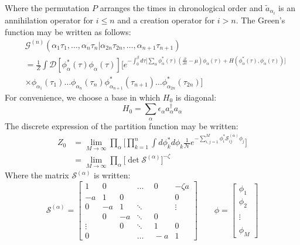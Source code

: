 \documentclass[12pt]{article}
\begin{document}
Where the permutation $P$ arranges the times in chronological order and 
$\tilde{a}_{\alpha_i}$ is an annihilation operator for $i\leq n$ and a creation 
operator for $i>n$. The Green's function may be written as follows:
\begin{equation*}
    \begin{split}
        &\mathcal{G}^{(n)}(\alpha_1\tau_1,\dots,\alpha_n\tau_n|
        \alpha_{2n}\tau_{2n},\dots,\alpha_{n+1}\tau_{n+1})\\
        &=\frac{1}{Z}\int\mathcal{D}[\phi^*_\alpha(\tau)\phi_\alpha(\tau)]
        \Big[e^{-\int_0^\beta d\tau
        \big[\sum_\alpha\phi_\alpha^*(\tau)(\frac{\partial}{\partial\tau}-\mu)
        \phi_\alpha(\tau)+H(\phi_\alpha^*(\tau),\phi_\alpha(\tau))\big]}\\
        &\times\phi_{\alpha_1}(\tau_1)\dots\phi_{\alpha_n}(\tau_n)
        \phi^*_{\alpha_{n+1}}(\tau_{n+1})\dots\phi^*_{\alpha_{2n}}(\tau_{2n})\Big]
    \end{split}
\end{equation*}
For convenience, we choose a base in which $H_0$ is diagonal:
\begin{equation*}
    H_0=\sum_\alpha\epsilon_\alpha a^\dagger_\alpha a_\alpha
\end{equation*}
The discrete expression of the partition function may be written:
\begin{equation*}
    \begin{split}
        Z_0&=\lim_{M\rightarrow\infty}\prod_\alpha\bigg[\prod_{k=1}^n\int 
        d\phi^*_kd\phi_k\frac{1}{\mathcal{N}}e^{
        -\sum\limits_{i,j=1}^M\phi^*_i\mathcal{S}^{(\alpha)}_{ij}\phi_j}\bigg]\\
        &=\lim_{M\rightarrow\infty}\prod_\alpha
        \big[\det\mathcal{S}^{(\alpha)}\big]^{-\zeta}
    \end{split}
\end{equation*}
Where the matrix $\mathcal{S}^{(\alpha)}$ is written:
\begin{equation*}
    \mathcal{S}^{(\alpha)}=\left[\begin{matrix}
        1      &0  &\   &\dots  &\ \ 0  &-\zeta a\\
        -a     &1  &0   &\      &\ \ \  &0\\
        0      &-a &1   &\ddots &\ \ \  &\vdots\\
        \      &0  &-a  &\ddots &\ \ 0  &\ \\
        \vdots &\  &0   &\ddots &\ \ 1  &0 \\
        0      &\  &\   &\dots  &\ \ -a &1
    \end{matrix}\right]\qquad
    \phi=\left[\begin{matrix}
        \phi_1\\
        \phi_2\\
         \\
        \vdots\\
         \\
        \phi_M
    \end{matrix}\right]
\end{equation*}
\end{document}
